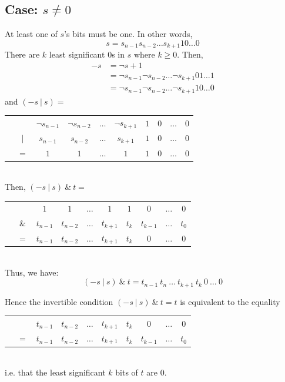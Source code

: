 \documentclass[11pt]{article}
\begin{document}
\subsection*{Case: $s \neq 0$}
At least one of $s$'s bits must be one. In other words,
$$s = s_{n-1}s_{n-2} \ldots s_{k+1}10 \ldots 0$$
There are $k$ least significant $0$s in $s$ where $k \geq 0$. Then,
\begin{align*}
	-s &= \neg s + 1\\
	&= \neg s_{n-1} \neg s_{n-2} \ldots \neg s_{k+1} 0 1 \ldots 1\\
	&= \neg s_{n-1} \neg s_{n-2} \ldots \neg s_{k+1} 1 0 \ldots 0
\end{align*}
and $(-s\ |\ s) =$\\
	\begin{tabular}{c c c c c c c c c c}
		& &$\neg s_{n-1}$ & $\neg s_{n-2}$ & $\ldots$ & $\neg s_{k+1}$ & $1$ & $0$ & $\ldots$ &$0$\\
		&$| $&$s_{n-1}$ &$s_{n-2}$ &$\ldots$ &$s_{k+1}$ &$1$ &$0$ &$\ldots$ &$0$\\
		&$= $&$1$ & $1$ & $\ldots$ & $1$ & $1$ & $0$ & $\ldots$ &$0$
	\end{tabular}\\
Then, $(-s\ |\ s)\ \&\ t =$\\
\begin{tabular}{c c c c c c c c c c}
	&$ $&$1$ & $1$ & $\ldots$ & $1$ & $1$ & $0$ & $\ldots$ &$0$\\
	&$\& $&$t_{n-1}$ &$t_{n-2}$ &$\ldots$ &$t_{k+1}$ &$t_k$ &$t_{k-1}$ &$\ldots$ &$t_0$\\
	&$= $&$t_{n-1}$ & $t_{n-2}$ & $\ldots$ & $t_{k+1}$ & $t_k$ & $0$ & $\ldots$ &$0$
\end{tabular}\\

Thus, we have:
\begin{equation*}
	\label{eq1}
	(-s\ |\ s)\ \&\ t = t_{n-1}\ t_{n}\ \ldots\ t_{k+1}\ t_k\ 0\ \ldots\ 0
\end{equation*}

Hence the invertible condition $(-s\ |\ s)\ \&\ t = t$ is equivalent to the equality \\
	\begin{tabular}{c c c c c c c c c c}
		&&$t_{n-1}$ & $t_{n-2}$ & $\ldots$ & $t_{k+1}$ & $t_k$ & $0$ & $\ldots$ &$0$\\
		&$= $&$t_{n-1}$ &$t_{n-2}$ &$\ldots$ &$t_{k+1}$ &$t_k$ &$t_{k-1}$ &$\ldots$ &$t_0$
	\end{tabular}\\
i.e. that the least significant $k$ bits of $t$ are $0$.
\end{document}
